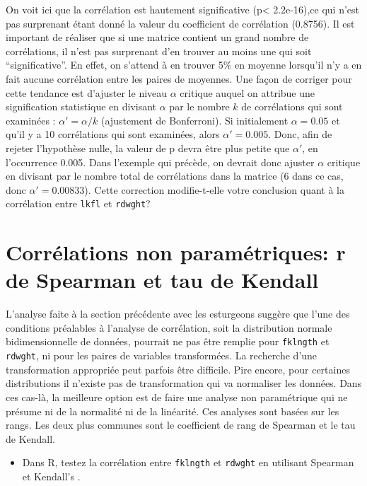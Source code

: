 \documentclass[12pt,]{book}
\providecommand{\tightlist}{%
  \setlength{\itemsep}{0pt}\setlength{\parskip}{0pt}}
\begin{document}
On voit ici que la corrélation est hautement significative (p\textless{} 2.2e-16),ce qui n'est pas surprenant étant donné la valeur du coefficient de corrélation (0.8756).
Il est important de réaliser que si une matrice contient un grand nombre de corrélations, il n'est pas surprenant d'en trouver au moins une qui soit ``significative''.
En effet, on s'attend à en trouver 5\% en moyenne lorsqu'il n'y a en fait aucune corrélation entre les paires de moyennes.
Une façon de corriger pour cette tendance est d'ajuster le niveau \(\alpha\) critique auquel on attribue une signification statistique en divisant \(\alpha\) par le nombre \(k\) de corrélations qui sont examinées : \(\alpha' = \alpha / k\) (ajustement de Bonferroni). Si initialement \(\alpha = 0.05\) et qu'il y a 10 corrélations qui sont examinées, alors \(\alpha'= 0.005\).
Donc, afin de rejeter l'hypothèse nulle, la valeur de p devra être plus petite que \(\alpha'\), en l'occurrence 0.005.
Dans l'exemple qui précède, on devrait donc ajuster \(\alpha\) critique en divisant par le nombre total de corrélations dans la matrice (6 dans ce cas, donc \(\alpha'=0.00833\)).
Cette correction modifie-t-elle votre conclusion quant à la corrélation entre \texttt{lkfl} et \texttt{rdwght}?

\hypertarget{corruxe9lations-non-paramuxe9triques-r-de-spearman-et-tau-de-kendall}{%
\section{Corrélations non paramétriques: r de Spearman et tau de Kendall}\label{corruxe9lations-non-paramuxe9triques-r-de-spearman-et-tau-de-kendall}}

L'analyse faite à la section précédente avec les esturgeons suggère que l'une des conditions préalables à l'analyse de corrélation, soit la distribution normale bidimensionnelle de données, pourrait ne pas être remplie pour \texttt{fklngth} et \texttt{rdwght}, ni pour les paires de variables transformées.
La recherche d'une transformation appropriée peut parfois être difficile.
Pire encore, pour certaines distributions il n'existe pas de transformation qui va normaliser les données.
Dans ces cas-là, la meilleure option est de faire une analyse non
paramétrique qui ne présume ni de la normalité ni de la linéarité.
Ces analyses sont basées sur les rangs.
Les deux plus communes sont le coefficient de rang de Spearman et le tau de Kendall.

\begin{itemize}
\tightlist
\item
  Dans R, testez la corrélation entre \texttt{fklngth} et \texttt{rdwght} en utilisant Spearman et Kendall's .
\end{itemize}
\end{document}
